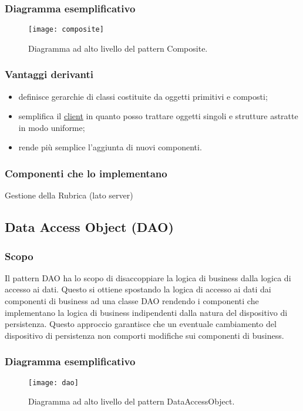 \subsubsection{Diagramma esemplificativo}
\begin{figure}[h]
\centering
\texttt{[image: composite]}
\caption{Diagramma ad alto livello del pattern Composite.}\label{fig:composite}
\end{figure}
\subsubsection{Vantaggi derivanti}
\begin{itemize}
\item definisce gerarchie di classi costituite da oggetti primitivi e composti;
\item semplifica il \underline{client} in quanto posso trattare oggetti singoli e strutture astratte in modo uniforme;
\item rende più semplice l'aggiunta di nuovi componenti.
\end{itemize}
\subsubsection{Componenti che lo implementano}
\item Gestione della Rubrica (lato server)

\subsection{Data Access Object (DAO)}
\subsubsection{Scopo}
Il pattern DAO ha lo scopo di disaccoppiare la logica di business dalla logica di accesso ai dati. Questo si ottiene spostando la logica di accesso ai dati dai componenti di business ad una classe DAO rendendo i componenti che implementano la logica di business indipendenti dalla natura del dispositivo di persistenza. Questo approccio garantisce che un eventuale cambiamento del dispositivo di persistenza non comporti modifiche sui componenti di business.
\subsubsection{Diagramma esemplificativo}
\begin{figure}[h]
\centering
\texttt{[image: dao]}
\caption{Diagramma ad alto livello del pattern DataAccessObject.}\label{fig:dao}
\end{figure}
